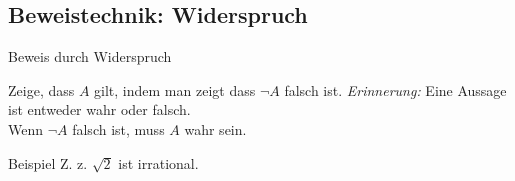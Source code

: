 \subsection{Beweistechnik: Widerspruch}
\begin{frame}[fragile]{Beweis durch Widerspruch}
	\small{
		\begin{alertblock}{Zeige, dass $A$ gilt, indem man zeigt dass $\neg A$ falsch ist.}
			\emph{Erinnerung:} Eine Aussage ist entweder wahr oder falsch.\\
			Wenn $\neg A$ falsch ist, muss $A$ wahr sein.
		\end{alertblock}
		\begin{exampleblock}{Beispiel}
			Z. z. $\sqrt{2}$ ist irrational.


\end{exampleblock}}
\end{frame}
